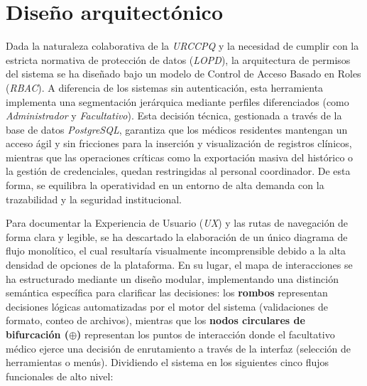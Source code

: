 \section{Diseño arquitectónico}
Dada la naturaleza colaborativa de la \textit{URCCPQ} y la necesidad de cumplir con la estricta normativa de protección de datos (\textit{LOPD}), la arquitectura de permisos del sistema se ha diseñado bajo un modelo de Control de Acceso Basado en Roles (\textit{RBAC}). A diferencia de los sistemas sin autenticación, esta herramienta implementa una segmentación jerárquica mediante perfiles diferenciados (como \textit{Administrador} y \textit{Facultativo}). Esta decisión técnica, gestionada a través de la base de datos \textit{PostgreSQL}, garantiza que los médicos residentes mantengan un acceso ágil y sin fricciones para la inserción y visualización de registros clínicos, mientras que las operaciones críticas como la exportación masiva del histórico o la gestión de credenciales, quedan restringidas al personal coordinador. De esta forma, se equilibra la operatividad en un entorno de alta demanda con la trazabilidad y la seguridad institucional.

Para documentar la Experiencia de Usuario (\textit{UX}) \cite{ux} y las rutas de navegación de forma clara y legible, se ha descartado la elaboración de un único diagrama de flujo monolítico, el cual resultaría visualmente incomprensible debido a la alta densidad de opciones de la plataforma. En su lugar, el mapa de interacciones se ha estructurado mediante un diseño modular, implementando una distinción semántica específica para clarificar las decisiones: los \textbf{rombos} representan decisiones lógicas automatizadas por el motor del sistema (validaciones de formato, conteo de archivos), mientras que los \textbf{nodos circulares de bifurcación ($\oplus$)} representan los puntos de interacción donde el facultativo médico ejerce una decisión de enrutamiento a través de la interfaz (selección de herramientas o menús). Dividiendo el sistema en los siguientes cinco flujos funcionales de alto nivel:


